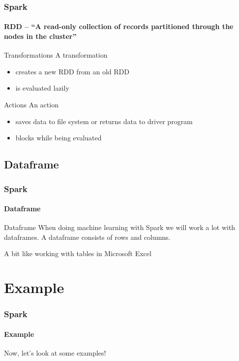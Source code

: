 \documentclass[aspectratio=169,usenames,dvipsnames]{beamer}
\begin{document}
        
        \begin{frame}
            \frametitle{Spark}
            \framesubtitle{RDD -- ``A read-only collection of records partitioned through the nodes in the cluster''}
            \begin{block}{Transformations}
                A transformation 
                \begin{itemize}
                    \item creates a \alert{new RDD} from an old RDD
                    \item is evaluated \alert{lazily}
                \end{itemize}
            \end{block}
            \begin{block}{Actions}
                An action 
                \begin{itemize}
                    \item \alert{saves data} to file system or \alert{returns data} to driver program
                    \item \alert{blocks} while being evaluated
                \end{itemize}
            \end{block}
        \end{frame}

    \subsection{Dataframe}
        \begin{frame}
            \frametitle{Spark}
            \framesubtitle{Dataframe}
            \begin{block}{Dataframe}
                When doing machine learning with Spark we will work a lot with
                dataframes. A dataframe consists of rows and columns.

                A bit like working with tables in Microsoft Excel \smiley{} 
            \end{block}
        \end{frame}

\section{Example}
        \begin{frame}
            \frametitle{Spark}
            \framesubtitle{Example}
            \begin{center}
                Now, let's look at some examples!
            \end{center}
        \end{frame}
\end{document}
